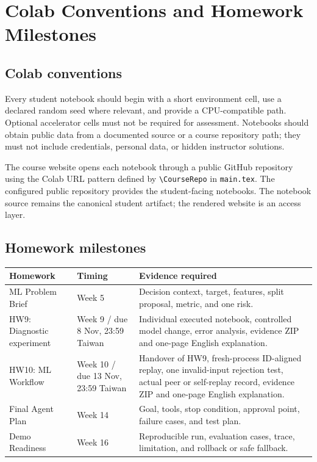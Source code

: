 \chapter{Colab Conventions and Homework Milestones}
\section{Colab conventions}
Every student notebook should begin with a short environment cell, use a declared random seed where relevant, and provide a CPU-compatible path. Optional accelerator cells must not be required for assessment. Notebooks should obtain public data from a documented source or a course repository path; they must not include credentials, personal data, or hidden instructor solutions.

The course website opens each notebook through a public GitHub repository using the Colab URL pattern defined by \verb|\CourseRepo| in \texttt{main.tex}. The configured public repository provides the student-facing notebooks. The notebook source remains the canonical student artifact; the rendered website is an access layer.

\section{Homework milestones}
\begin{tabularx}{\textwidth}{@{}p{} p{} X@{}}
\toprule
\textbf{Homework} & \textbf{Timing} & \textbf{Evidence required} \\
\midrule
ML Problem Brief & Week 5 & Decision context, target, features, split proposal, metric, and one risk. \\
HW9: Diagnostic experiment & Week 9 / due 8 Nov, 23:59 Taiwan & Individual executed notebook, controlled model change, error analysis, evidence ZIP and one-page English explanation. \\
HW10: ML Workflow & Week 10 / due 13 Nov, 23:59 Taiwan & Handover of HW9, fresh-process ID-aligned replay, one invalid-input rejection test, actual peer or self-replay record, evidence ZIP and one-page English explanation. \\
Final Agent Plan & Week 14 & Goal, tools, stop condition, approval point, failure cases, and test plan. \\
Demo Readiness & Week 16 & Reproducible run, evaluation cases, trace, limitation, and rollback or safe fallback. \\
\bottomrule
\end{tabularx}


